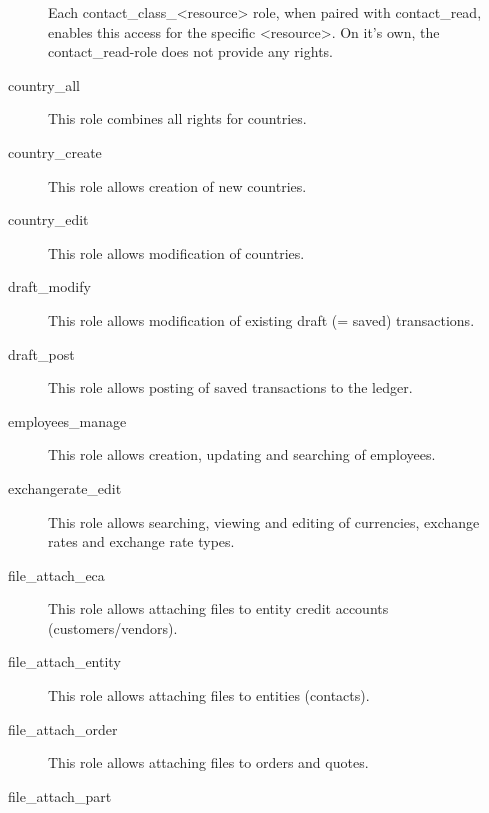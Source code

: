 \begin{description}
                         Each contact\_class\_\textless{}resource\textgreater{} role, when paired with contact\_read, enables
                         this access for the specific \textless{}resource\textgreater{}. On it's own, the contact\_read-role
                         does not provide any rights.
\item [country\_all] \htmlspacing 
                         This role combines all rights for countries.
\item [country\_create] \htmlspacing 
                         This role allows creation of new countries.
\item [country\_edit] \htmlspacing 
                         This role allows modification of countries.
\item [draft\_modify] \htmlspacing 
                         This role allows modification of existing draft (= saved) transactions.
\item [draft\_post] \htmlspacing 
                         This role allows posting of saved transactions to the ledger.
\item [employees\_manage] \htmlspacing 
                         This role allows creation, updating and searching of employees.
\item [exchangerate\_edit] \htmlspacing 
                         This role allows searching, viewing and editing of currencies, exchange rates and exchange rate types.
\item [file\_attach\_eca] \htmlspacing 
                         This role allows attaching files to entity credit accounts (customers/vendors).
\item [file\_attach\_entity] \htmlspacing 
                         This role allows attaching files to entities (contacts).
\item [file\_attach\_order] \htmlspacing 
                         This role allows attaching files to orders and quotes.
\item [file\_attach\_part] \htmlspacing 

\end{description}
